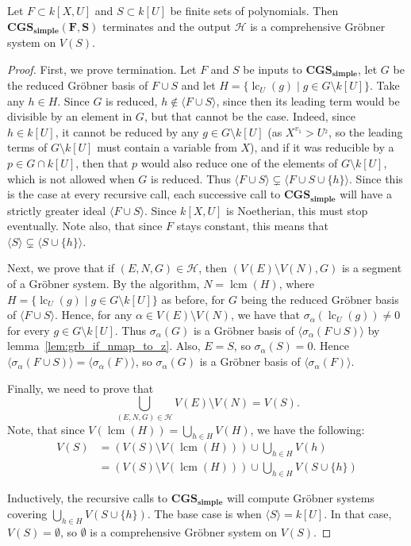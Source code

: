 \documentclass[a4paper, 12pt]{article}
\DeclareMathOperator{\LC}{lc}
\DeclareMathOperator{\lcm}{lcm}
\theoremstyle{changedot}
\theoremstyle{changedotbreak}
\theoremstyle{nonumberplain}
\newtheorem{proof}{Proof}
\begin{document}
\begin{theorem}
  Let $F \subset k[X, U]$ and $S \subset k[U]$ be finite sets of polynomials. Then $\mathbf{CGS_{simple}(F, S)}$ terminates and the output $\mathcal H$ is a comprehensive Gröbner system on $V(S)$.
\end{theorem}
\begin{proof}
  First, we prove termination. Let $F$ and $S$ be inputs to $\mathbf{CGS_{simple}}$, let $G$ be the reduced Gröbner basis of $F \cup S$ and let $H = \{\LC_{U}(g) \mid g \in G \setminus k[U]\}$. Take any $h \in H$. Since $G$ is reduced, $h \notin \langle F \cup S \rangle$, since then its leading term would be divisible by an element in $G$, but that cannot be the case. Indeed, since $h \in k[U]$, it cannot be reduced by any $g \in G \setminus k[U]$ (as $X^{v_{1}} > U^{_{2}}$, so the leading terms of $G \setminus k[U]$ must contain a variable from $X$), and if it was reducible by a $p \in G \cap k[U]$, then that $p$ would also reduce one of the elements of $G \setminus k[U]$, which is not allowed when $G$ is reduced. Thus $\langle F \cup S \rangle \subsetneq \langle F \cup S \cup \{h\} \rangle$. Since this is the case at every recursive call, each successive call to $\mathbf{CGS_{simple}}$ will have a strictly greater ideal $\langle F \cup S \rangle$. Since $k[X, U]$ is Noetherian, this must stop eventually. Note also, that since $F$ stays constant, this means that $\langle S \rangle \subsetneq \langle S \cup \{h\} \rangle$.

  Next, we prove that if $(E, N, G) \in \mathcal H$, then $(V(E) \setminus V(N), G)$ is a segment of a Gröbner system. By the algorithm, $N = \lcm(H)$, where $H = \{\LC_{U}(g) \mid g \in G \setminus k[U]\}$ as before, for $G$ being the reduced Gröbner basis of $\langle F \cup S \rangle$. Hence, for any $\alpha \in V(E) \setminus V(N)$, we have that $\sigma_{\alpha}(\LC_{U}(g)) \neq 0$ for every $g \in G \setminus k[U]$. Thus $\sigma_{\alpha}(G)$ is a Gröbner basis of $\langle \sigma_{\alpha}(F \cup S) \rangle$ by lemma~\ref{lem:grb_if_nmap_to_z}. Also, $E = S$, so $\sigma_{\alpha}(S) = 0$. Hence $\langle \sigma_{\alpha}(F \cup S) \rangle = \langle \sigma_{\alpha}(F) \rangle$, so $\sigma_{\alpha}(G)$ is a Gröbner basis of $\langle \sigma_{\alpha}(F) \rangle$.

  Finally, we need to prove that \[\bigcup_{(E, N, G) \in \mathcal H} V(E) \setminus V(N) = V(S).\]
  Note, that since $V(\lcm(H)) = \bigcup_{h \in H} V(H)$, we have the following:
  \begin{align*}
    V(S) &= (V(S) \setminus V(\lcm(H))) \cup \bigcup_{h \in H} V(h) \\
    &= (V(S) \setminus V(\lcm(H))) \cup \bigcup_{h \in H} V(S \cup \{h\})
  \end{align*}

  Inductively, the recursive calls to $\mathbf{CGS_{simple}}$ will compute Gröbner systems covering $\bigcup_{h \in H} V(S \cup \{h\})$. The base case is when $\langle S \rangle = k[U]$. In that case, $V(S) = \emptyset$, so $\emptyset$ is a comprehensive Gröbner system on $V(S)$.
\end{proof}
\end{document}
